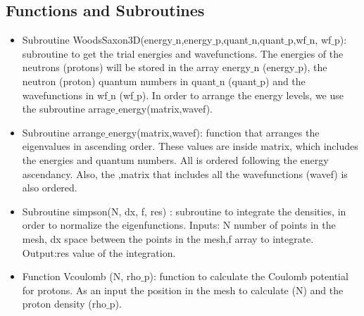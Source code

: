 \documentclass[a4paper,10pt]{article}
\begin{document}
\subsection{Functions and Subroutines}
\begin{itemize}

\item Subroutine WoodsSaxon3D(energy$\_$n,energy$\_$p,quant$\_$n,quant$\_$p,wf$\_$n, wf$\_$p): subroutine to get the 
trial energies and wavefunctions. The energies of the neutrons (protons) will be
stored in the array energy$\_$n  (energy$\_$p), the neutron (proton) quantum numbers
in quant$\_$n (quant$\_$p) and the wavefunctions in wf$\_$n (wf$\_$p). In order to arrange the energy 
levels, we use the subroutine arrage$\_$energy(matrix,wavef).
\item Subroutine arrange$\_$energy(matrix,wavef): function that arranges the eigenvalues in ascending order. 
These values are inside matrix, which includes the energies and quantum numbers. All is 
ordered following the energy ascendancy. Also, the ,matrix that includes all the wavefunctions
(wavef) is also ordered.
 \item Subroutine simpson(N, dx, f, res) : subroutine to integrate the densities, in order to normalize the 
eigenfunctions. Inputs: N number of points in the mesh, dx space between the points in the mesh,f array
to integrate. Output:res  value of the integration. 
\item Function Vcoulomb (N, rho$\_$p): function to calculate the Coulomb potential for protons. As an input
the position in the mesh to calculate (N) and the proton density (rho$\_$p).
\end{itemize}
\end{document}
